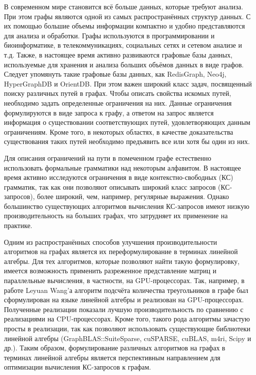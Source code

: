 
{\actuality} 
В современном мире становится всё больше данных, которые требуют анализа. При этом графы являются одной из самых распространённых структур данных. С их помощью большие объемы информации компактно и удобно представляются для анализа и обработки. Графы используются в программировании и биоинформатике, в телекоммуникациях, социальных сетях и сетевом анализе и т.д. Также, в настоящее время активно развиваются графовые базы данных, используемые для хранения и анализа больших объёмов данных в виде графов. Следует упомянуть такие графовые базы данных, как RedisGraph, Neo4j, HyperGraphDB и OrientDB. При этом важен широкий класс задач, посвященный поиску различных путей в графах. Чтобы описать свойства искомых путей, необходимо задать определенные ограничения на них. Данные ограничения формулируются в виде запроса к графу, а ответом на запрос является информация о существовании соответствующих путей, удовлетворяющих данным ограничениям. Кроме того, в некоторых областях, в качестве доказательства существования таких путей необходимо предъявить все или хотя бы один из них.

Для описания ограничений на пути в помеченном графе естественно использовать формальные грамматики над некоторым алфавитом. В настоящее время активно исследуются ограничения в виде контекстно-свободных (КС) грамматик, так как они позволяют описывать широкий класс запросов (КС-запросов), более широкий, чем, например, регулярные выражения. Однако большинство существующих алгоритмов вычисления КС-запросов имеют низкую производительность на больших графах, что затрудняет их применение на практике.

Одним из распространённых способов улучшения производительности алгоритмов на графах является их переформулирование в терминах линейной алгебры. Для тех алгоритмов, которые позволяют найти такую формулировку, имеется возможность применить разреженное представление матриц и параллельные вычисления, в частности, на GPU-процессорах. Так, например, в работе Leyuan Wang'а алгоритм подсчёта количества треугольников в графе был сформулирован на языке линейной алгебры и реализован на GPU-процессорах. Полученные реализации показали лучшую производительность по сравнению с реализациями на CPU-процессорах. Кроме того, такого рода алгоритмы зачастую просты в реализации, так как позволяют использовать существующие библиотеки линейной алгебры (GraphBLAS::SuiteSparse, cuSPARSE, cuBLAS, m4ri, Scipy и др.). Таким образом, формулирование различных алгоритмов на графах в терминах линейной алгебры является перспективным направлением для оптимизации вычисления КС-запросов к графам.

